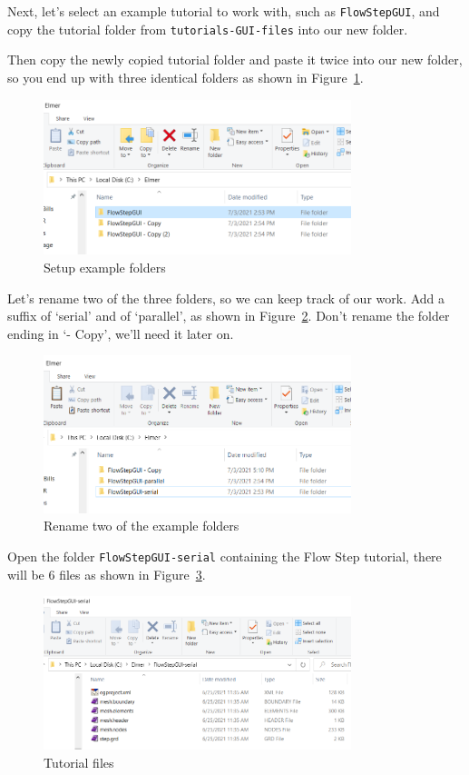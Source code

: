 Next, let's select an example tutorial to work with, such as \texttt{FlowStepGUI}, and copy the tutorial folder from \texttt{tutorials-GUI-files} into our new folder.

Then copy the newly copied tutorial folder and paste it twice into our new folder, so you end up with three identical folders as shown in Figure~\ref{fg:folders}.

\begin{figure}[H]
\centering
\includegraphics[width=0.8\textwidth]{serial-10}
\caption{Setup example folders}\label{fg:folders}
\end{figure}

\newpage

Let's rename two of the three folders, so we can keep track of our work.  Add a suffix of `serial' and of `parallel', as shown in Figure~\ref{fg:folders-rename}.  Don't rename the folder ending in `- Copy', we'll need it later on.

\begin{figure}[H]
\centering
\includegraphics[width=0.8\textwidth]{serial-11}
\caption{Rename two of the example folders}\label{fg:folders-rename}
\end{figure}

Open the folder \texttt{FlowStepGUI-serial} containing the Flow Step tutorial, there will be 6 files as shown in Figure~\ref{fg:folders-orig}.

\begin{figure}[H]
\centering
\includegraphics[width=0.8\textwidth]{serial-12}
\caption{Tutorial files}\label{fg:folders-orig}
\end{figure}

